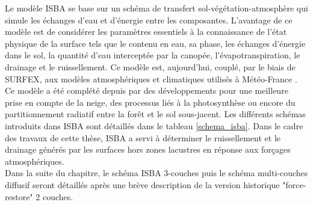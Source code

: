 Le modèle ISBA \citep{noilhan1989} se base sur un schéma de transfert sol-végétation-atmosphère qui simule les échanges d'eau et d'énergie entre les composantes. L'avantage de ce modèle est de considérer les paramètres essentiels à la connaissance de l'état physique de la surface tels que le contenu en eau, sa phase, les échanges d'énergie dans le sol, la quantité d'eau interceptée par la canopée, l'évapotranspiration, le drainage et le ruissellement. Ce modèle est, aujourd'hui, couplé, par le biais de SURFEX, aux modèles atmosphériques et climatiques utilisés à Météo-France \citep{voldoire2019}. Ce modèle a été complété depuis par des développements pour une meilleure prise en compte de la neige, des processus liés à la photosynthèse ou encore du partitionnement radiatif entre la forêt et le sol sous-jacent. Les différents schémas introduits dans ISBA sont détaillés dans le tableau \ref{schema_isba}.
Dans le cadre des travaux de cette thèse, ISBA a servi à déterminer le ruissellement et le drainage générés par les surfaces hors zones lacustres en réponse aux forçages atmosphériques. \\
\noindent Dans la suite du chapitre, le schéma ISBA 3-couches puis le schéma multi-couches diffusif seront détaillés après une brève description de la version historique "force-restore" 2 couches.

